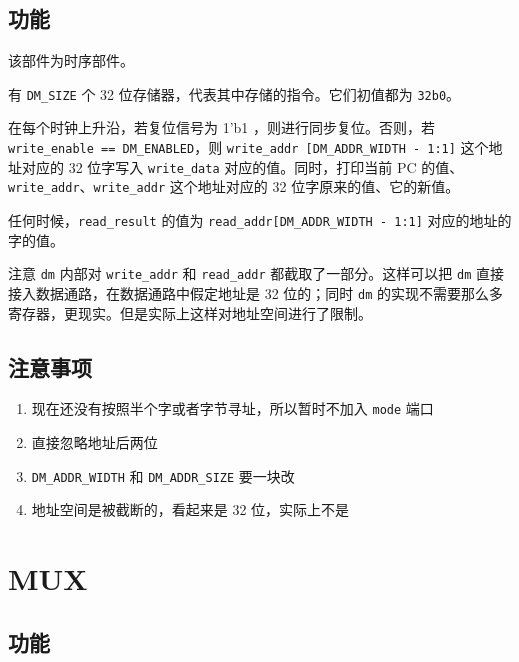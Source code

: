 \documentclass[12pt,AutoFakeBold]{article}
\providecommand{\tightlist}{%
  \setlength{\itemsep}{0pt}\setlength{\parskip}{0pt}}
\begin{document}
\hypertarget{ux529fux80fd-8}{%
\subsection{功能}\label{ux529fux80fd-8}}

该部件为时序部件。

有 \texttt{DM\_SIZE} 个 32 位存储器，代表其中存储的指令。它们初值都为 \texttt{32\textquotesingle{}b0}。 

在每个时钟上升沿，若复位信号为 1'b1 ，则进行同步复位。否则，若 \texttt{write\_enable\ ==\ DM\_ENABLED}，则
\texttt{write\_addr\ {[}DM\_ADDR\_WIDTH\ -\ 1:1{]}} 这个地址对应的 32 位字写入 \texttt{write\_data} 对应的值。同时，打印当前 PC 的值、\texttt{write\_addr}、\texttt{write\_addr} 这个地址对应的 32 位字原来的值、它的新值。

任何时候，\texttt{read\_result} 的值为
\texttt{read\_addr{[}DM\_ADDR\_WIDTH\ -\ 1:1{]}} 对应的地址的字的值。

注意 \texttt{dm} 内部对 \texttt{write\_addr} 和 \texttt{read\_addr}
都截取了一部分。这样可以把 \texttt{dm}
直接接入数据通路，在数据通路中假定地址是 32 位的；同时 \texttt{dm}
的实现不需要那么多寄存器，更现实。但是实际上这样对地址空间进行了限制。

\hypertarget{ux6ce8ux610fux4e8bux9879-5}{%
\subsection{注意事项}\label{ux6ce8ux610fux4e8bux9879-5}}

\begin{enumerate}
\def\labelenumi{\arabic{enumi}.}
\tightlist
\item
  现在还没有按照半个字或者字节寻址，所以暂时不加入 \texttt{mode} 端口
\item
  直接忽略地址后两位
\item
  \texttt{DM\_ADDR\_WIDTH} 和 \texttt{DM\_ADDR\_SIZE} 要一块改
\item
  地址空间是被截断的，看起来是 32 位，实际上不是
\end{enumerate}

\hypertarget{mux}{%
\section{MUX}\label{mux}}

\hypertarget{ux529fux80fd-9}{%
\subsection{功能}\label{ux529fux80fd-9}}
\end{document}
